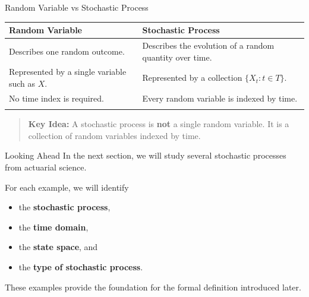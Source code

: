 \documentclass[
  ignorenonframetext,
  aspectratio=169,
]{beamer}
\newcounter{none} %
\providecommand{\tightlist}{%
  \setlength{\itemsep}{0pt}\setlength{\parskip}{0pt}}
\begin{document}
\begin{frame}{Random Variable vs Stochastic Process}
\protect{}\label{random-variable-vs-stochastic-process}
{\def\LTcaptype{none} %
\begin{longtable}[]{@{}
  >{\raggedright\arraybackslash}p{}
  >{\raggedright\arraybackslash}p{}@{}}
\toprule\noalign{}
\begin{minipage}[b]{\linewidth}\raggedright
Random Variable
\end{minipage} & \begin{minipage}[b]{\linewidth}\raggedright
Stochastic Process
\end{minipage} \\
\midrule\noalign{}
\endhead
Describes one random outcome. & Describes the evolution of a random
quantity over time. \\
Represented by a single variable such as \(X\). & Represented by a
collection \(\{X_t:t\in T\}\). \\
No time index is required. & Every random variable is indexed by
time. \\
\bottomrule\noalign{}
\end{longtable}
}

\begin{quote}
\textbf{Key Idea:} A stochastic process is \textbf{not} a single random
variable. It is a collection of random variables indexed by time.
\end{quote}
\end{frame}

\begin{frame}{Looking Ahead}
\protect{}\label{looking-ahead}
In the next section, we will study several stochastic processes from
actuarial science.

For each example, we will identify

\begin{itemize}
\tightlist
\item
  the \textbf{stochastic process},
\item
  the \textbf{time domain},
\item
  the \textbf{state space}, and
\item
  the \textbf{type of stochastic process}.
\end{itemize}

These examples provide the foundation for the formal definition
introduced later.
\end{frame}
\end{document}
